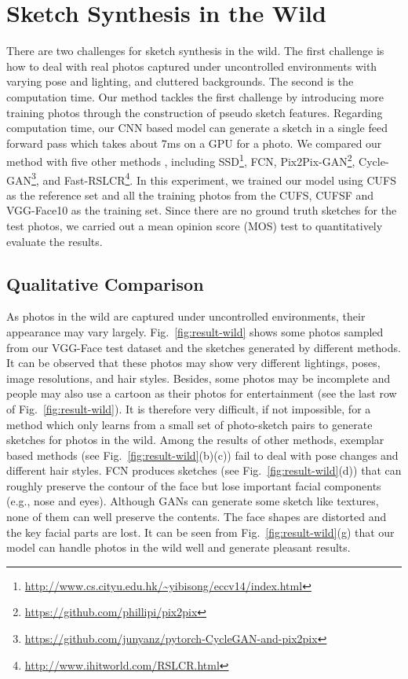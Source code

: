 \documentclass[runningheads]{llncs}
\begin{document}
\section{Sketch Synthesis in the Wild} \label{sec:wild}
There are two challenges for sketch synthesis in the wild. The first challenge is how to deal with real photos captured under uncontrolled environments with varying pose and lighting, and cluttered backgrounds. The second is the computation time. Our method tackles the first challenge by introducing more training photos through the construction of pseudo sketch features. Regarding computation time, our CNN based model can generate a sketch in a single feed forward pass which takes about 7ms on a GPU for a  photo. We compared our method with five other methods , including SSD\footnote{\url{http://www.cs.cityu.edu.hk/~yibisong/eccv14/index.html}}, FCN, Pix2Pix-GAN\footnote{\url{https://github.com/phillipi/pix2pix}}, Cycle-GAN\footnote{\url{https://github.com/junyanz/pytorch-CycleGAN-and-pix2pix}}, and Fast-RSLCR\footnote{\url{http://www.ihitworld.com/RSLCR.html}}. In this experiment, we trained our model using CUFS as the reference set and all the training photos from the CUFS, CUFSF and VGG-Face10 as the training set. Since there are no ground truth sketches for the test photos, we carried out a mean opinion score (MOS) test to quantitatively evaluate the results.

\subsection{Qualitative Comparison}

As photos in the wild are captured under uncontrolled environments, their appearance may vary largely. Fig.~\ref{fig:result-wild} shows some photos sampled from our VGG-Face test dataset and the sketches generated by different methods. It can be observed that these photos may show very different lightings, poses, image resolutions, and hair styles. Besides, some photos may be incomplete and people may also use a cartoon as their photos for entertainment (see the last row of Fig.~\ref{fig:result-wild}). It is therefore very difficult, if not impossible, for a method which only learns from a small set of photo-sketch pairs to generate sketches for photos in the wild. Among the results of other methods, exemplar based methods (see Fig.~\ref{fig:result-wild}(b)(c)) fail to deal with pose changes and different hair styles. FCN produces sketches (see Fig.~\ref{fig:result-wild}(d)) that can roughly preserve the contour of the face but lose important facial components (e.g., nose and eyes). Although GANs can generate some sketch like textures, none of them can well preserve the contents. The face shapes are distorted and the key facial parts are lost. It can be seen from Fig.~\ref{fig:result-wild}(g) that our model can handle photos in the wild well and generate pleasant results.
\end{document}
